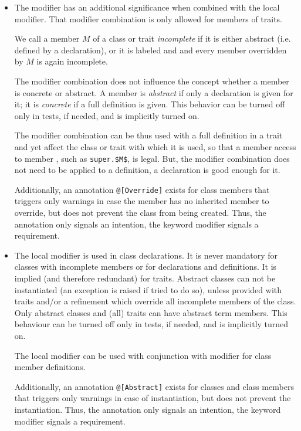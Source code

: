 \begin{itemize}
\item
The  modifier has an additional significance when combined with the  local modifier. That modifier combination is only allowed for members of traits. 

We call a member $M$ of a class or trait {\em incomplete} if it is either abstract (i.e. defined by a declaration), or it is labeled  and  and every member overridden by $M$ is again incomplete. 

The  modifier combination does not influence the concept whether a member is concrete or abstract. A member is {\em abstract} if only a declaration is given for it; it is {\em concrete} if a full definition is given. This behavior can be turned off only in tests, if needed, and is implicitly turned on. 

The  modifier combination can be thus used with a full definition in a trait and yet affect the class or trait with which it is used, so that a member access to member , such as \lstinline!super.$M$!, is legal. But, the  modifier combination does not need to be applied to a definition, a declaration is good enough for it. 

Additionally, an annotation \lstinline!@[Override]! exists for class members that triggers only warnings in case the member has no inherited member to override, but does not prevent the class from being created. Thus, the annotation only signals an intention, the keyword modifier signals a requirement. 

\item
The  local modifier is used in class declarations. It is never mandatory for classes with incomplete members or for declarations and definitions. It is implied (and therefore redundant) for traits. Abstract classes can not be instantiated (an exception is raised if tried to do so), unless provided with traits and/or a refinement which override all incomplete members of the class. Only abstract classes and (all) traits can have abstract term members. This behaviour can be turned off only in tests, if needed, and is implicitly turned on. 

The  local modifier can be used with conjunction with  modifier for class member definitions. 

Additionally, an annotation \lstinline!@[Abstract]! exists for classes and class members that triggers only warnings in case of instantiation, but does not prevent the instantiation. Thus, the annotation only signals an intention, the keyword modifier signals a requirement. 


\end{itemize}

